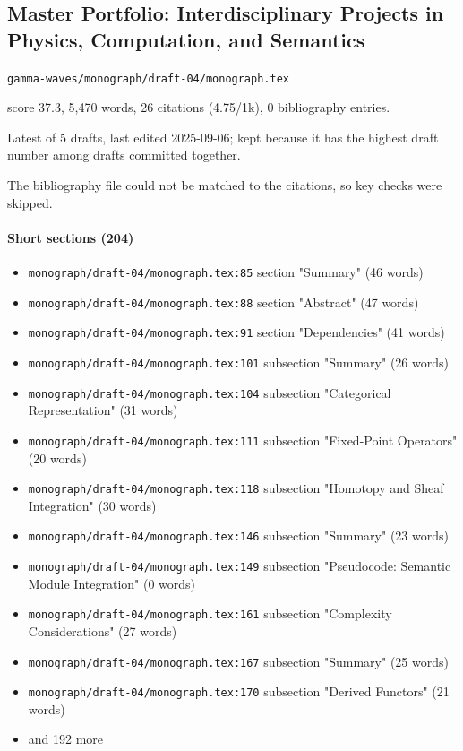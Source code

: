\documentclass[11pt]{article}
\newcommand{\loc}[1]{{\small\color{muted}\texttt{#1}}}
\begin{document}
\subsection{Master Portfolio: Interdisciplinary Projects in Physics, Computation, and Semantics}
\loc{gamma-waves/\allowbreak{}monograph/\allowbreak{}draft-04/\allowbreak{}monograph.tex}\par
score 37.3, 5,470 words, 26 citations (4.75/1k), 0 bibliography entries.

Latest of 5 drafts, last edited 2025-09-06; kept because it has the highest draft number among drafts committed together.

The bibliography file could not be matched to the citations, so key checks were skipped.

\paragraph{Short sections (204)}
\begin{itemize}
\item \loc{monograph/\allowbreak{}draft-04/\allowbreak{}monograph.tex:85} section "Summary" (46 words)
\item \loc{monograph/\allowbreak{}draft-04/\allowbreak{}monograph.tex:88} section "Abstract" (47 words)
\item \loc{monograph/\allowbreak{}draft-04/\allowbreak{}monograph.tex:91} section "Dependencies" (41 words)
\item \loc{monograph/\allowbreak{}draft-04/\allowbreak{}monograph.tex:101} subsection "Summary" (26 words)
\item \loc{monograph/\allowbreak{}draft-04/\allowbreak{}monograph.tex:104} subsection "Categorical Representation" (31 words)
\item \loc{monograph/\allowbreak{}draft-04/\allowbreak{}monograph.tex:111} subsection "Fixed-Point Operators" (20 words)
\item \loc{monograph/\allowbreak{}draft-04/\allowbreak{}monograph.tex:118} subsection "Homotopy and Sheaf Integration" (30 words)
\item \loc{monograph/\allowbreak{}draft-04/\allowbreak{}monograph.tex:146} subsection "Summary" (23 words)
\item \loc{monograph/\allowbreak{}draft-04/\allowbreak{}monograph.tex:149} subsection "Pseudocode: Semantic Module Integration" (0 words)
\item \loc{monograph/\allowbreak{}draft-04/\allowbreak{}monograph.tex:161} subsection "Complexity Considerations" (27 words)
\item \loc{monograph/\allowbreak{}draft-04/\allowbreak{}monograph.tex:167} subsection "Summary" (25 words)
\item \loc{monograph/\allowbreak{}draft-04/\allowbreak{}monograph.tex:170} subsection "Derived Functors" (21 words)
\item[] {\color{muted}\small and 192 more}
\end{itemize}
\end{document}
